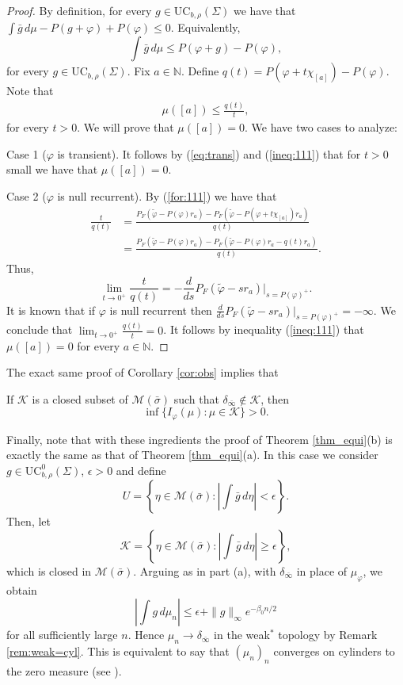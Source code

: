 \documentclass[letterpaper,11pt]{amsart}
\numberwithin{equation}{section}     %
\newcommand{\K}{\mathcal{K}}
\newcommand{\M}{\mathcal{M}}
\newcommand{\N}{\mathbb{N}}
\def\phi{\varphi}
\def\N{{\mathbb N}}
\def\M{{\mathcal M}}
\def\le{\leqslant}
\def\ge{\geqslant}
\def\M{\mathcal{M}}
\begin{document}
\begin{proof} By definition,   for every $g\in  \text{UC}_{b,\rho}(\Sigma)$ we have that  $\int \bar{g} \,d\mu-P(g+\phi)+P(\phi)\le 0$.  Equivalently, 
$$\int \bar{g} \, d\mu\le P(\phi+g)-P(\phi),$$
for every $g\in  \text{UC}_{b,\rho}(\Sigma)$. Fix $a\in\N$. Define $q(t)=P(\phi+t\chi_{[a]})-P(\phi)$. Note that
\begin{align}\label{ineq:111}
    \mu([a])\le \frac{q(t)}{t},
\end{align}
for every $t>0$. We will prove that $\mu([a])=0$. We have two cases to analyze: 

Case 1 ($\phi$ is transient). It follows by  (\ref{eq:trans}) and (\ref{ineq:111}) that for $t>0$ small we have that $\mu([a])=0$.

Case 2 ($\phi$ is null recurrent). By  (\ref{for:111}) we have that 
\begin{align*}
    \frac{t}{q(t)}&=\frac{P_F(\tilde{\phi}-P(\phi)r_a)-P_F(\tilde{\phi}-P(\phi+t\chi_{[a]})r_a)}{q(t)}\\
    &=\frac{P_F(\tilde{\phi}-P(\phi)r_a)-P_F(\tilde{\phi}-P(\phi)r_a-q(t)r_a)}{q(t)}.
\end{align*}
Thus, 
\[
\lim_{t\to 0^+}\frac{t}{q(t)}=-\frac{d}{ds}P_F(\tilde{\phi}-sr_a)\bigg|_{s=P(\phi)^+}.
\]
It is known that if $\phi$ is null recurrent then $\frac{d}{ds}P_F(\tilde{\phi}-sr_a)\big|_{s=P(\phi)^+}=-\infty$. We conclude that $\lim_{t\to 0^+}\frac{q(t)}{t}=0$. It follows by inequality (\ref{ineq:111}) that $\mu([a])=0$ for every $a\in\N$.
\end{proof}

The exact same proof of Corollary \ref{cor:obs} implies that 
\begin{corollary} 
If $\mathcal{K}$ is a closed subset of $\M(\bar\sigma)$ such that $\delta_{\bar\infty}\notin\mathcal{K}$, then  $$\inf\{I_\phi(\mu):\mu\in \mathcal{K}\}>0.$$
\end{corollary}

Finally, note that with these ingredients the proof of Theorem \ref{thm_equi}(b) is exactly the same as that of Theorem \ref{thm_equi}(a). In this case we consider $g\in \mathrm{UC}_{b,\rho}^0(\Sigma)$, $\epsilon>0$ and define
$$U=\left\{\eta\in\M(\bar\sigma):\left|\int \bar g\,d\eta\right|<\epsilon\right\}.$$
Then, let
$$\K=\left\{\eta\in\M(\bar\sigma):\left|\int \bar g\,d\eta\right|\ge\epsilon\right\},$$
which is closed in $\M(\bar\sigma)$. Arguing as in part (a), with $\delta_{\bar\infty}$ in place of $\mu_\phi$, we obtain
$$\left|\int g\,d\mu_n\right|\le \epsilon+\|g\|_\infty e^{-\beta_0n/2}$$
for all sufficiently large $n$. Hence $\mu_n\to\delta_{\bar\infty}$ in the weak$^\ast$ topology by Remark \ref{rem:weak=cyl}. This is equivalent to say that $(\mu_n)_n$ converges on cylinders to the zero measure (see  \cite[Theorem 3.5]{iv2}).
\end{document}
